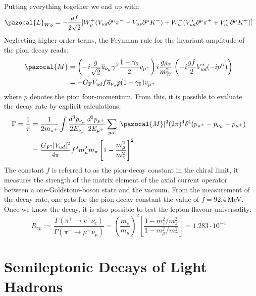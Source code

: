 \documentclass[../main.tex]{subfiles}
\begin{document}
Putting everything together we end up with:
\[
\pazocal{L}_{W\phi}=-\frac{gf}{2\sqrt{2}}[W_\mu^+(V_{ud}\partial^\mu\pi^-+V_{us}\partial^\mu K^-)+W_\mu^-(V_{ud}^*\partial^\mu\pi^++V_{us}^*\partial^\mu K^+)]
\]
Neglecting higher order terms, the Feynman rule for the invariant amplitude of the pion decay reads:
\begin{align*}
\pazocal{M}&=\left(-i\frac{g}{\sqrt{2}}\overline{u}_{\nu_\mu}\gamma^\beta\frac{1-\gamma_5}{2}v_{\mu^+}\right)i\frac{g_{\beta\alpha}}{m_W^2}\left(-i\frac{gf}{2}V_{ud}^*(-ip^\alpha)\right)\\
&=-G_{\text{F}}V_{ud}f\overline{u}_{\nu_\mu}\slashed{p}(1-\gamma_5)v_{\mu^+}
\end{align*}
where $p$ denotes the pion four-momentum.
From this, it is possible to evaluate the decay rate by explicit calculations:
\begin{align*}
\Gamma=\frac{1}{\tau}&=\frac{1}{2m_{\pi^+}}\int\frac{d^3p_{\nu_\mu}}{2E_{\nu_\mu}}\frac{d^3p_{\mu^+}}{2E_{\mu^+}}\sum_{\text{pol}}|\pazocal{M}|^2(2\pi)^4\delta^4(p_{\pi^+}-p_{\nu_\mu}-p_{\mu^+})\\
&=\frac{G_{\text{F}^2}|V_{ud}|^2}{4\pi}f^2m_\mu^2m_\pi\left[1-\frac{m_\mu^2}{m_\pi^2}\right]^2
\end{align*}
The constant $f$ is referred to as the pion-decay constant in the chiral limit, it measures the strength of the matrix element of the axial current
operator between a one-Goldstone-boson state and the vacuum. From the measurement of the decay rate, one gets for the pion-decay constant the value of $f=92.4$\,MeV.
Once we know the decay, it is also possible to test the lepton flavour universality:
\[
R_{e\mu}:=\frac{\Gamma(\pi^+\to e^+\nu_e)}{\Gamma(\pi^+\to\mu^+\nu_\mu)}=\left(\frac{m_e}{m_\mu}\right)^2\left[\frac{1-m_e^2/m_\pi^2}{1-m_\mu^2/m_\pi^2}\right]=1.283\cdot10^{-4}
\]
\section{Semileptonic Decays of Light Hadrons}
\end{document}
